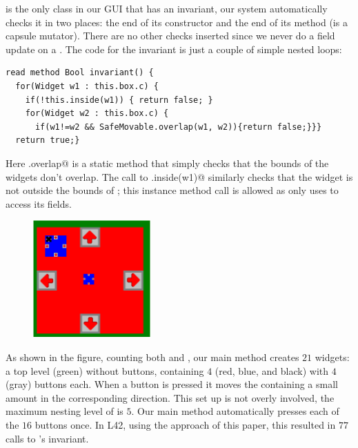 \Q@SafeMovable@ is the only class in our GUI that has an invariant, our system automatically checks it in two places: the end of its constructor and the end of its \Q@dispatch@ method (is a capsule mutator). There are no other checks inserted since we never do a field update on a \Q@SafeMovable@. The code for the invariant is just a couple of simple nested loops:
\begin{lstlisting}
read method Bool invariant() {
  for(Widget w1 : this.box.c) {
    if(!this.inside(w1)) { return false; }
    for(Widget w2 : this.box.c) {
      if(w1!=w2 && SafeMovable.overlap(w1, w2)){return false;}}}
  return true;}
\end{lstlisting}
Here \Q@SafeMovable.overlap@ is a static method that simply checks that the bounds of the widgets don't overlap. The call to \Q@this.inside(w1)@ similarly checks that the widget is not outside the bounds of \Q@this@; this instance method call is allowed as \Q@inside@ only uses \Q@this@ to access its fields.%


\begin{figure}
    \centering\includegraphics[width=0.4\textwidth]{GuiImg}\end{figure}
 As shown in the figure, counting both \Q@SafeMovable@s and \Q@Button@s, our main method creates $21$ widgets: a top level (green) \Q@SafeMovable@ without buttons, containing $4$ (red, blue, and black) \Q@SafeMovable@s with
$4$ (gray) buttons each. When a button is pressed it moves the containing \Q@SafeMovable@ a small amount in the corresponding direction.
This set up is not overly involved, the maximum nesting level of \Q@Widget@s is $5$.
Our main method automatically presses each of the $16$ buttons once. In L42, using the approach of this paper, this resulted in $77$ calls to \Q@SafeMovable@'s invariant.

